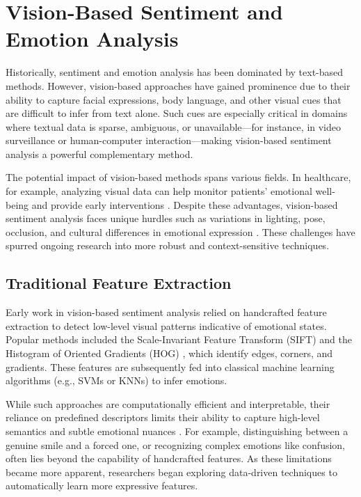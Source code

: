 \section{Vision-Based Sentiment and Emotion Analysis}
\label{sec:vision_analysis}

Historically, sentiment and emotion analysis has been dominated by text-based methods. However, vision-based approaches have gained prominence due to their ability to capture facial expressions, body language, and other visual cues that are difficult to infer from text alone. Such cues are especially critical in domains where textual data is sparse, ambiguous, or unavailable—for instance, in video surveillance or human-computer interaction—making vision-based sentiment analysis a powerful complementary method.
\newline

The potential impact of vision-based methods spans various fields. In healthcare, for example, analyzing visual data can help monitor patients’ emotional well-being and provide early interventions \cite{6940284}. Despite these advantages, vision-based sentiment analysis faces unique hurdles such as variations in lighting, pose, occlusion, and cultural differences in emotional expression \cite{10.1145/3240508.3240574}. These challenges have spurred ongoing research into more robust and context-sensitive techniques.

\subsection*{Traditional Feature Extraction}

Early work in vision-based sentiment analysis relied on handcrafted feature extraction to detect low-level visual patterns indicative of emotional states. Popular methods included the Scale-Invariant Feature Transform (SIFT) \cite{Lowe2004DistinctiveIF} and the Histogram of Oriented Gradients (HOG) \cite{1467360}, which identify edges, corners, and gradients. These features are subsequently fed into classical machine learning algorithms (e.g., SVMs or KNNs) to infer emotions.
\newline

While such approaches are computationally efficient and interpretable, their reliance on predefined descriptors limits their ability to capture high-level semantics and subtle emotional nuances \cite{6940284}. For example, distinguishing between a genuine smile and a forced one, or recognizing complex emotions like confusion, often lies beyond the capability of handcrafted features. As these limitations became more apparent, researchers began exploring data-driven techniques to automatically learn more expressive features.

